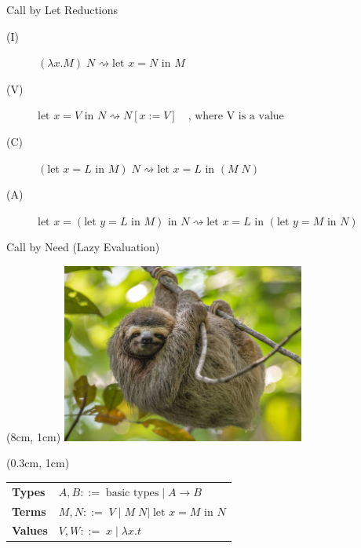 \documentclass[10pt]{beamer}
\newcommand{\lam}[2]{\lambda #1 . #2}
\newcommand{\plet}[3]{\text{let }   #1 = #2 \text{ in } #3}
\newcommand{\app}[2]{#1 \; #2}
\newcommand{\subst}[2]{[#1 := #2]}
\begin{document}
\begin{frame}[fragile]{Call by Let Reductions}
  \begin{description}
    \item[(I)] $\app{(\lam{x}{M})}{N} \rightsquigarrow \plet{x}{N}{M}$
    \item[(V)] $\plet{x}{V}{N} \rightsquigarrow N \subst{x}{V} \quad \text{, where V is a value}$
    \item[(C)] $\app{(\plet{x}{L}{M})}{N} \rightsquigarrow \plet{x}{L}{(\app{M}{N})}$
    \item[(A)] $\plet{x}{(\plet{y}{L}{M})}{N} \rightsquigarrow \plet{x}{L}{(\plet{y}{M}{N})}$
  \end{description}

\end{frame}


\begin{frame}[fragile]{Call by Need (Lazy Evaluation)}

  \begin{textblock*}{5cm}(8cm, 1cm)
    \includegraphics[width=0.6\textwidth]{fauldeier.jpg}
  \end{textblock*}

  \begin{textblock*}{3cm}(0.3cm, 1cm)
    \begin{table}
      \begin{tabular}{ll}
        \toprule
        \textbf{Types}  & $A, B ::= \; \text{basic types} \; | \; A \rightarrow B$  \\
        \textbf{Terms}  & $M, N ::=   \; V \; | \; \app{M}{N}  | \; \plet{x}{M}{N}$ \\
        \textbf{Values} & $V, W ::= \; x \; | \; \lam{x}{t}$                        \\
        \bottomrule
      \end{tabular}
    \end{table}
  \end{textblock*}


\end{frame}
\end{document}
